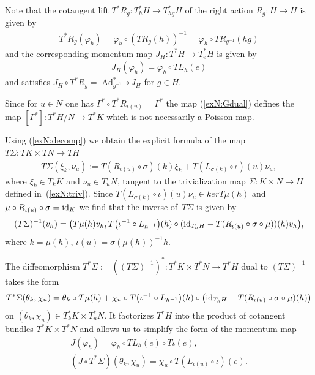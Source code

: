 \documentclass[pdftex]{sigma}
\renewcommand{\to}{\rightarrow}
\DeclareMathOperator{\Ad}{Ad}
\newcommand{\id}{\text{\upshape id}}
\numberwithin{equation}{section}
\begin{document}
Note that the cotangent lift $T^*R_g\colon T^*_hH\to T^*_{hg}H$ of the right action $R_g\colon H\to H$ is given by
 \begin{gather}\label{exN:lift} T^*R_g(\varphi_h)=\varphi_h\circ(TR_g(h))^{-1}=\varphi_h\circ TR_{g^{-1}}(hg)\end{gather}
 and the corresponding momentum map $J_H\colon T^*H\to T^*_e H $ is given by{\samepage
 \begin{gather}\label{exN:momH}J_H(\varphi_h)=\varphi_h\circ TL_h(e)\end{gather}
 and satisf\/ies $ J_H\circ T^*R_g=\Ad^*_{g^{-1}}\circ J_H $ for $g\in H$.}

 Since for $u\in N$ one has $\Gamma^*\circ T^*R_{\iota(u)}=\Gamma^*$ the map (\ref{exN:Gdual}) def\/ines the map $[\Gamma^*]\colon T^*H/N\to T^*K$ which is not necessarily a Poisson map.

Using (\ref{exN:decomp}) we obtain the explicit formula of the map $T\Sigma\colon TK\times TN\to TH$
 \begin{gather}\label{exN:tangentriv} T\Sigma(\xi_k,\nu_u):=T(R_{\iota(u)}\circ \sigma)(k)\xi_k+T(L_{\sigma(k)}\circ \iota)(u)\nu_u,\end{gather}
where $\xi_k\in T_kK$ and $\nu_u\in T_uN$, tangent to the trivialization map $\Sigma\colon K\times N\to H$ def\/ined in~(\ref{exN:triv}). Since $T(L_{\sigma(k)}\circ\iota)(u)\nu_u\in ker T\mu(h)$ and~$\label{exN:prop1} \mu\circ R_{\iota(u)}\circ \sigma=\id_K$ we f\/ind that the inverse of~$T\Sigma$ is given by
\begin{gather*} (T\Sigma)^{-1}(v_h)=\big(T\mu(h)v_h,T\big(\iota^{-1}\circ L_{h^{-1}}\big)(h)\circ(\id_{T_hH}-T(R_{\iota(u)}\circ\sigma\circ \mu))(h)v_h\big),\end{gather*}
where $k=\mu(h)$, $\iota(u)=\sigma(\mu(h))^{-1}h$.

 The dif\/feomorphism $T^*\Sigma:=((T\Sigma)^{-1})^*\colon T^*K\times T^*N\to T^*H$ dual to $(T\Sigma)^{-1}$ takes the form
 \begin{gather*} T^*\Sigma(\theta_k,\chi_u)=\theta_k\circ T\mu(h)+\chi_u\circ T\big(\iota^{-1}\circ L_{h^{-1}}\big)(h)\circ\big(\id_{T_hH}-T(R_{\iota(u)}\circ\sigma\circ \mu)(h)\big)\end{gather*}
 on $(\theta_k,\chi_u)\in T_k^*K\times T_u^*N$. It factorizes $T^*H$ into the product of cotangent bundles $T^*K\times T^*N$ and allows us to simplify the form of the momentum map
\begin{gather*} J(\varphi_h)=\varphi_h\circ TL_h(e)\circ T\iota(e),\\
(J\circ T^*\Sigma)(\theta_k,\chi_u)=\chi_u\circ T(L_{\iota(u)}\circ\iota)(e).\end{gather*}
\end{document}
